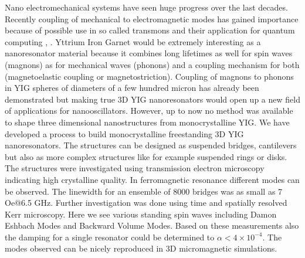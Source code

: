 Nano electromechanical systems have seen huge progress over the last decades. Recently coupling of mechanical to electromagnetic modes has gained importance because of possible use in so called transmons and their application for quantum computing \cite{O_Connell_2010},\cite{Chu_2017} . Yttrium Iron Garnet would be extremely interesting as a nanoresonator material because it combines long lifetimes as well for spin waves (magnons) as for mechanical waves (phonons) and a coupling mechanism for both (magnetoelastic coupling or magnetostriction). Coupling of magnons to phonons in YIG spheres of diameters of a few hundred micron has already been demonstrated\cite{Zhang_2016} but making true 3D YIG nanoresonators would open up a new field of applications for nanooscillators. However, up to now no method was available to shape three dimensional nanostructures from monocrystalline YIG. We have developed a process to build monocrystalline freestanding 3D YIG nanoresonators. The structures can be designed as suspended bridges, cantilevers but also as more complex structures like for example suspended rings or disks. The structures were investigated using transmission electron microscopy indicating high crystalline quality. In ferromagnetic resonance different modes can be observed. The linewidth for an ensemble of 8000 bridges was as small as 
7 Oe@6.5 GHz. Further investigation was done using time and spatially resolved Kerr microscopy. Here we see various standing spin waves including Damon Eshbach Modes and Backward Volume Modes. Based on these measurements also the damping for a single resonator could be determined to $\alpha < 4\times 10^{-4}$. The modes observed can be nicely reproduced in 3D micromagnetic simulations.